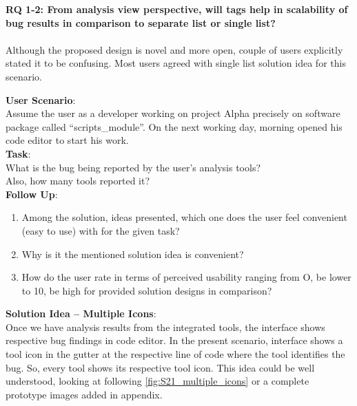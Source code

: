 \begin{myboxi}{{\textbf{RQ 1-2: From analysis view perspective, will tags help in scalability of bug results in comparison to separate list or single list?}}}
\\ \\ Although the proposed design is novel and more open, couple of users explicitly stated it to be confusing. Most users agreed with single list solution idea for this scenario.
\end{myboxi}

\clearpage
\textbf{User Scenario}: \\

Assume the user as a developer working on project Alpha precisely on software package called “scripts\_module”. On the next working day, morning opened his code editor to start his work. \\

\textbf{Task}: \\

What is the bug being reported by the user’s analysis tools? \\ Also, how many tools reported it? \\

\textbf{Follow Up}:

\begin{enumerate}
\item Among the solution, ideas presented, which one does the user feel convenient (easy to use) with for the given task?
\item Why is it the mentioned solution idea is convenient?
\item How do the user rate in terms of perceived usability ranging from O, be lower to 10, be high for provided solution designs in comparison? \\
\end{enumerate}

\textbf{Solution Idea – Multiple Icons}: \\

Once we have analysis results from the integrated tools, the interface shows respective bug findings in code editor. In the present scenario, interface shows a tool icon in the gutter at the respective line of code where the tool identifies the bug. So, every tool shows its respective tool icon. This idea could be well understood, looking at following \autoref{fig:S21_multiple_icons} or a complete prototype images added in appendix. \\


